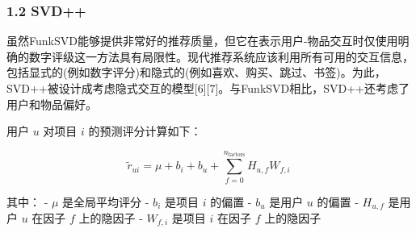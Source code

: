 \subsubsection{1.2 SVD++}
虽然FunkSVD能够提供非常好的推荐质量，但它在表示用户-物品交互时仅使用明确的数字评级这一方法具有局限性。现代推荐系统应该利用所有可用的交互信息，包括显式的(例如数字评分)和隐式的(例如喜欢、购买、跳过、书签)。为此，SVD++被设计成考虑隐式交互的模型[6][7]。与FunkSVD相比，SVD++还考虑了用户和物品偏好。

用户 $u$ 对项目 $i$ 的预测评分计算如下：

$$\tilde{r}_{ui} = \mu + b_i + b_u + \sum_{f=0}^{n_{\text{factors}}} H_{u,f} W_{f,i}~$$

其中：
- $\mu$ 是全局平均评分
- $b_i$ 是项目 $i$ 的偏置
- $b_u$ 是用户 $u$ 的偏置
- $H_{u,f}$ 是用户 $u$ 在因子 $f$ 上的隐因子
- $W_{f,i}$ 是项目 $i$ 在因子 $f$ 上的隐因子